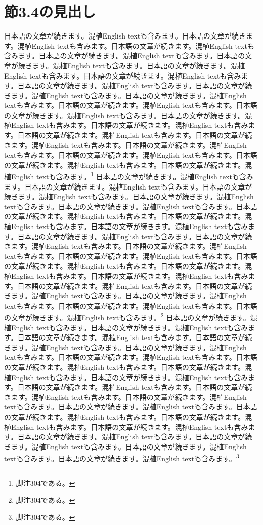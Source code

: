 \documentclass[pdflatex,book]{jlreq}
\begin{document}
\section{節3.4の見出し}
日本語の文章が続きます。混植English textも含みます。日本語の文章が続きます。混植English textも含みます。日本語の文章が続きます。混植English textも含みます。日本語の文章が続きます。混植English textも含みます。日本語の文章が続きます。混植English textも含みます。日本語の文章が続きます。混植English textも含みます。日本語の文章が続きます。混植English textも含みます。日本語の文章が続きます。混植English textも含みます。日本語の文章が続きます。混植English textも含みます。日本語の文章が続きます。混植English textも含みます。日本語の文章が続きます。混植English textも含みます。日本語の文章が続きます。混植English textも含みます。日本語の文章が続きます。混植English textも含みます。日本語の文章が続きます。混植English textも含みます。日本語の文章が続きます。混植English textも含みます。日本語の文章が続きます。混植English textも含みます。日本語の文章が続きます。混植English textも含みます。日本語の文章が続きます。混植English textも含みます。日本語の文章が続きます。混植English textも含みます。日本語の文章が続きます。混植English textも含みます。\footnote{脚注304である。}
日本語の文章が続きます。混植English textも含みます。日本語の文章が続きます。混植English textも含みます。日本語の文章が続きます。混植English textも含みます。日本語の文章が続きます。混植English textも含みます。日本語の文章が続きます。混植English textも含みます。日本語の文章が続きます。混植English textも含みます。日本語の文章が続きます。混植English textも含みます。日本語の文章が続きます。混植English textも含みます。日本語の文章が続きます。混植English textも含みます。日本語の文章が続きます。混植English textも含みます。日本語の文章が続きます。混植English textも含みます。日本語の文章が続きます。混植English textも含みます。日本語の文章が続きます。混植English textも含みます。日本語の文章が続きます。混植English textも含みます。日本語の文章が続きます。混植English textも含みます。日本語の文章が続きます。混植English textも含みます。日本語の文章が続きます。混植English textも含みます。日本語の文章が続きます。混植English textも含みます。日本語の文章が続きます。混植English textも含みます。日本語の文章が続きます。混植English textも含みます。\footnote{脚注304である。}
日本語の文章が続きます。混植English textも含みます。日本語の文章が続きます。混植English textも含みます。日本語の文章が続きます。混植English textも含みます。日本語の文章が続きます。混植English textも含みます。日本語の文章が続きます。混植English textも含みます。日本語の文章が続きます。混植English textも含みます。日本語の文章が続きます。混植English textも含みます。日本語の文章が続きます。混植English textも含みます。日本語の文章が続きます。混植English textも含みます。日本語の文章が続きます。混植English textも含みます。日本語の文章が続きます。混植English textも含みます。日本語の文章が続きます。混植English textも含みます。日本語の文章が続きます。混植English textも含みます。日本語の文章が続きます。混植English textも含みます。日本語の文章が続きます。混植English textも含みます。日本語の文章が続きます。混植English textも含みます。日本語の文章が続きます。混植English textも含みます。日本語の文章が続きます。混植English textも含みます。日本語の文章が続きます。混植English textも含みます。日本語の文章が続きます。混植English textも含みます。\footnote{脚注304である。}
\end{document}
